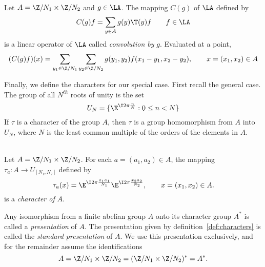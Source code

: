 \begin{definition}[Convolution by $g \in \LA$]\\ %
Let $A = \Z/N_1 \times \Z/N_2$ and $g \in \LA$. The mapping $C(g)$ of 
$\LA$ %
defined by 
\[
C(g)f = \sum_{y \in A}g(y)\T(y)f \qquad f \in \LA
\]
is a linear operator of 
$\LA$ %
called \emph{convolution by} $g$.  Evaluated at a point,
\[
(C(g)f)(x) %
=\sum_{y_1\in \Z/N_1}\sum_{y_2\in \Z/N_2}g(y_1,y_2)f(x_1-y_1,x_2-y_2),
\qquad  x = (x_1,x_2) \in 
A %
\]
\end{definition}

Finally, we define the characters for our special case.
First recall the general case. The group of all $N^{th}$ roots of unity is
the set
\[
U_N = \{\E^{\I 2\pi \frac{n}{N}}: 0 \leq n < N \}
\]
If $\tau$ is a character of the group $A$, then $\tau$ is a group homomorphism
from $A$ into $U_N$, where $N$ is the least common multiple of the orders of
the elements in $A$. 

\begin{definition}\\
\label{def:characters}
Let $A = \Z/N_1\times \Z/N_2$.
For each $a  = (a_1, a_2) \in A$, the mapping
$\tau_a: A \to U_{[N_1,N_2]}$ defined by
\[
\tau_a(x) = \E^{\I 2\pi \frac{x_1a_1}{N_1}}\E^{\I 2\pi \frac{x_2a_2}{N_2}}, \qquad
x  = (x_1, x_2) \in A.
\]
is a \emph{character of} $A$.
\end{definition}

Any isomorphism from a finite abelian
group $A$ onto its character group $A^*$ is called a \emph{presentation} of
$A$.  The presentation given by definition~\ref{def:characters} is called the 
\emph{standard presentation} of $A$.
We use this presentation exclusively, and for the remainder
assume the identifications
\[
A = \Z/N_1 \times \Z/N_2 = (\Z/N_1 \times \Z/N_2)^* = A^*.
\]


